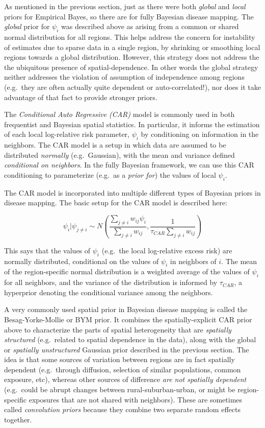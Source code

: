 \documentclass[
]{book}
\begin{document}
As mentioned in the previous section, just as there were both \emph{global} and \emph{local} priors for Empirical Bayes, so there are for fully Bayesian disease mapping. The \emph{global} prior for \(\psi_i\) was described above as arising from a common or shared normal distribution for all regions. This helps address the concern for instability of estimates due to sparse data in a single region, by shrinking or smoothing local regions towards a global distribution. However, this strategy does not address the the ubiquitous presence of spatial-dependence. In other words the global strategy neither addresses the violation of assumption of independence among regions (e.g.~they are often actually quite dependent or auto-correlated!), nor does it take advantage of that fact to provide stronger priors.

The \emph{Conditional Auto Regressive (CAR)} model is commonly used in both frequentist and Bayesian spatial statistics. In particular, it informs the estimation of each local log-relative risk parameter, \(\psi_i\) by conditioning on information in the neighbors. The CAR model is a setup in which data are assumed to be distributed \emph{normally} (e.g.~Gaussian), with the mean and variance defined \emph{conditional on neighbors}. In the fully Bayesian framework, we can use this CAR conditioning to parameterize (e.g.~as a \emph{prior for}) the values of local \(\psi_i\).

The CAR model is incorporated into multiple different types of Bayesian priors in disease mapping. The basic setup for the CAR model is described here:

\[\psi_i|\psi_{j \neq i} \sim N\left(\frac{\sum_{j \neq i} w_{ij}\psi_i}{\sum_{j \neq i}w_{ij}}, \frac{1}{\tau_{CAR}\sum_{j \neq i}w_{ij}}\right)\]

This says that the values of \(\psi_i\) (e.g.~the local log-relative excess risk) are normally distributed, conditional on the values of \(\psi_i\) in neighbors of \(i\). The mean of the region-specific normal distribution is a weighted average of the values of \(\psi_i\) for all neighbors, and the variance of the distribution is informed by \(\tau_{CAR}\), a hyperprior denoting the conditional variance among the neighbors.

A very commonly used spatial prior in Bayesian disease mapping is called the Besag-Yorke-Mollie or BYM prior. It combines the spatially-explicit CAR prior above to characterize the parts of spatial heterogeneity that are \emph{spatially structured} (e.g.~related to spatial dependence in the data), along with the global or \emph{spatially unstructured} Gaussian prior described in the previous section. The idea is that some sources of variation between regions are in fact spatially dependent (e.g.~through diffusion, selection of similar populations, common exposure, etc), whereas other sources of difference \emph{are not spatially dependent} (e.g.~could be abrupt changes between rural-suburban-urban, or might be region-specific exposures that are not shared with neighbors). These are sometimes called \emph{convolution priors} because they combine two separate random effects together.
\end{document}

